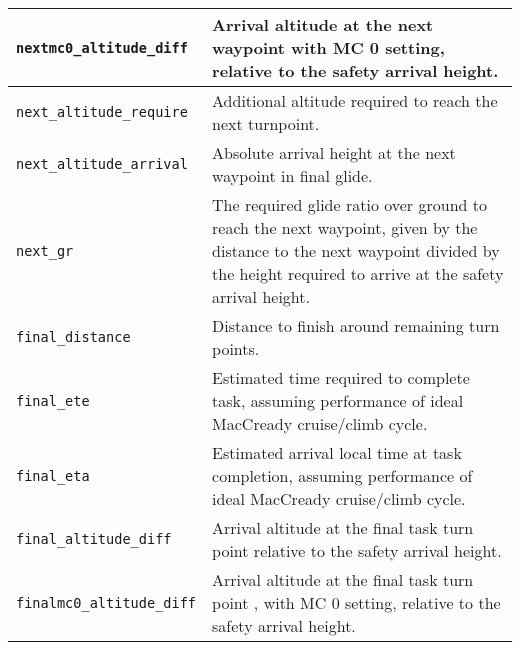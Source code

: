 \begin{maxipage}
\begin{tabularx}{1.9\textwidth}{l|X}
\hline

\verb|nextmc0_altitude_diff| & Arrival altitude at the next waypoint with
MC 0 setting, relative to the \newline safety arrival height. \\

\hline

\verb|next_altitude_require| & Additional altitude required to reach the next
turnpoint. \\

\hline

\verb|next_altitude_arrival| & Absolute arrival height at the next waypoint in
final glide. \\

\hline

\verb|next_gr| & The required glide ratio over ground to reach the next waypoint,
\newline given by the distance to the next waypoint divided by the height
\newline required to arrive at the safety arrival height. \\

\hline

\verb|final_distance| & Distance to finish around remaining turn points. \\

\hline

\verb|final_ete| & Estimated time required to complete task,
assuming performance \newline of ideal MacCready cruise/climb cycle. \\

\hline

\verb|final_eta| & Estimated arrival local time at task completion,
assuming performance \newline of ideal MacCready cruise/climb cycle. \\

\hline

\verb|final_altitude_diff| & Arrival altitude at the final task turn point
relative to the safety arrival \newline height. \\

\hline

\verb|finalmc0_altitude_diff| & Arrival altitude at the final task turn point
, with MC 0 setting, relative \newline to the safety arrival height. \\


\end{tabularx}
\end{maxipage}
